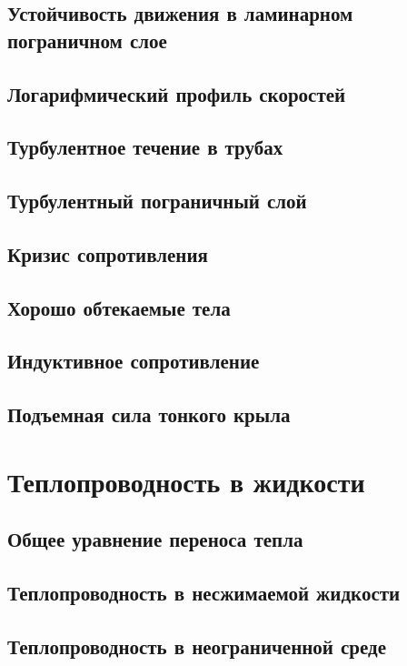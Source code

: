 \documentclass[12pt,a4paper]{book}
\begin{document}
\section{Устойчивость движения в ламинарном пограничном слое}\label{sec:p41}
\section{Логарифмический профиль скоростей}\label{sec:p42}
\section{Турбулентное течение в трубах}\label{sec:p43}
\section{Турбулентный пограничный слой}\label{sec:p44}
\section{Кризис сопротивления}\label{sec:p45}
\section{Хорошо обтекаемые тела}\label{sec:p46}
\section{Индуктивное сопротивление}\label{sec:p47}
\section{Подъемная сила тонкого крыла}\label{sec:p48}

\chapter{Теплопроводность в жидкости}
\section{Общее уравнение переноса тепла}\label{sec:p49}
\section{Теплопроводность в несжимаемой жидкости}\label{sec:p50}
\section{Теплопроводность в неограниченной среде}\label{sec:p51}
\end{document}
